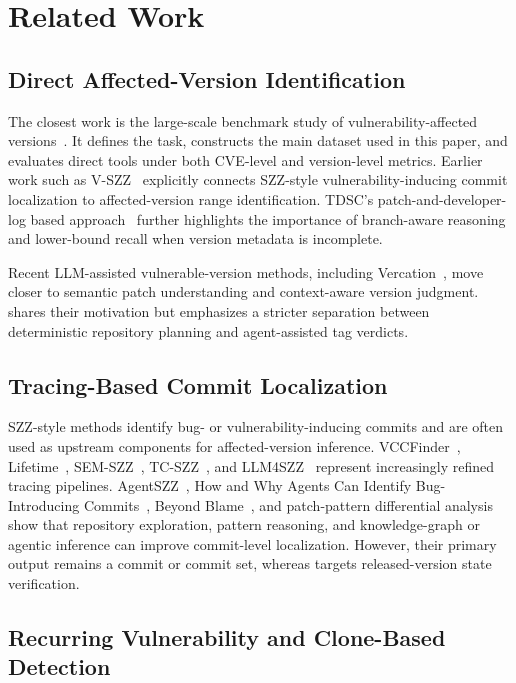 \section{Related Work}
\label{sec:related}

\subsection{Direct Affected-Version Identification}

The closest work is the large-scale benchmark study of vulnerability-affected versions~\cite{howfar2025}. It defines the task, constructs the main dataset used in this paper, and evaluates direct tools under both CVE-level and version-level metrics. Earlier work such as V-SZZ~\cite{vszz2022} explicitly connects SZZ-style vulnerability-inducing commit localization to affected-version range identification. TDSC's patch-and-developer-log based approach~\cite{tdsc2024} further highlights the importance of branch-aware reasoning and lower-bound recall when version metadata is incomplete.

Recent LLM-assisted vulnerable-version methods, including Vercation~\cite{vercation2026}, move closer to semantic patch understanding and context-aware version judgment. \toolname shares their motivation but emphasizes a stricter separation between deterministic repository planning and agent-assisted tag verdicts.

\subsection{Tracing-Based Commit Localization}

SZZ-style methods identify bug- or vulnerability-inducing commits and are often used as upstream components for affected-version inference. VCCFinder~\cite{vccfinder2015}, Lifetime~\cite{lifetime2021}, SEM-SZZ~\cite{semszz2024}, TC-SZZ~\cite{tcszz2024}, and LLM4SZZ~\cite{llm4szz2025} represent increasingly refined tracing pipelines. AgentSZZ~\cite{agentszz2026}, How and Why Agents Can Identify Bug-Introducing Commits~\cite{howwhyagents2026}, Beyond Blame~\cite{beyondblame2026}, and patch-pattern differential analysis~\cite{vicpatterns2026} show that repository exploration, pattern reasoning, and knowledge-graph or agentic inference can improve commit-level localization. However, their primary output remains a commit or commit set, whereas \toolname targets released-version state verification.

\subsection{Recurring Vulnerability and Clone-Based Detection}

